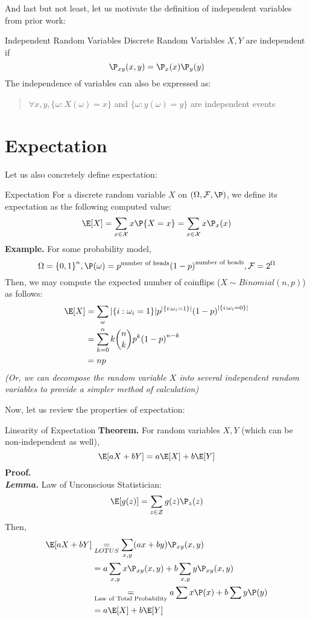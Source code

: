 And last but not least, let us motivate the definition of independent variables from prior work:
\begin{ln-define}{Independent Random Variables}{}
    Discrete Random Variables $X,Y$ are independent if
    \[\P_{xy}(x, y) = \P_x(x) \P_y(y)\]
    The independence of variables can also be expressed as:
    \begin{quote}
        $\forall x, y, \{\omega : X(\omega) = x\}$ and $\{\omega : y(\omega) = y\}$ are independent events
    \end{quote}
\end{ln-define}

\section{Expectation}
Let us also concretely define expectation:
\begin{ln-define}{Expectation}{}
    For a discrete random variable $X$ on $(\Omega, \mathcal{F}, \P)$, we define its expectation as the following computed value:
    \[
        \E[X] = \sum_{x \in \mathcal{X}} x \P\{X = x\} = \sum_{x \in \mathcal{X}} x \P_x(x)
    \]
    \tcblower
    \textbf{Example.} For some probability model,
    \[
        \Omega = {\{0, 1\}}^n, \P(\omega) = p^{\text{number of heads}}  {(1 - p)}^{\text{number of heads}}, \mathcal{F} = 2^{\Omega}
    \]
    Then, we may compute the expected number of coinflips ($X \sim Binomial(n, p)$) as follows:
    \begin{align*}
        \E[X]
        &= \sum_{\omega} |\{i: \omega_i = 1\}| p^{|\{i: \omega_i = 1\}|} {(1 - p)}^{|\{i: \omega_i = 0\}|} \\
        &= \sum_{k = 0}^n k \binom{n}{k} p^k {(1 - p)}^{n - k} \\
        &= np
    \end{align*}
    \textit{(Or, we can decompose the random variable $X$ into several independent random variables to provide a simpler method of calculation)}
\end{ln-define}
Now, let us review the properties of expectation:
\begin{ln-theorem}{Linearity of Expectation}{}
    \textbf{Theorem.} For random variables $X, Y$ (which can be non-independent as well),
    \[
        \E[aX + bY] = a\E[X] + b\E[Y]
    \]
    \tcblower
    \textbf{Proof.} \\
    \textbf{\textit{Lemma.}} Law of Unconscious Statistician:
    \[\E[g(z)] = \sum_{z \in \mathcal{Z}} g(z) \P_z(z)\]
    Then, 
    \begin{align*}
        \E[aX + bY]
        &\underset{LOTUS}{=} \sum_{x,y} (ax + by) \P_{xy}(x, y) \\
        &= a \sum_{x,y} x \P_{xy}(x, y) + b \sum_{x,y} y \P_{xy}(x, y) \\
        &\underset{\text{Law of Total Probability}}{=} a \sum x\P(x) + b \sum y\P(y) \\
        &= a\E[X] + b\E[Y]
    \end{align*}
\end{ln-theorem}
